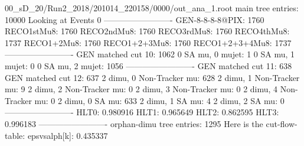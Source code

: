 00_sD_20/Run2_2018/201014_220158/0000/out_ana_1.root
main tree entries: 10000
Looking at Events 0
-------------------------
GEN-8-8-8-8@PIX: 1760
RECO1stMu8: 1760
RECO2ndMu8: 1760
RECO3rdMu8: 1760
RECO4thMu8: 1737
RECO1+2Mu8: 1760
RECO1+2+3Mu8: 1760
RECO1+2+3+4Mu8: 1737
-------------------------
GEN matched cut 10: 1062
0 SA mu, 0 mujet: 1
0 SA mu, 1 mujet: 0
0 SA mu, 2 mujet: 1056
-------------------------
GEN matched cut 11: 638
GEN matched cut 12: 637
2 dimu, 0 Non-Tracker mu: 628
2 dimu, 1 Non-Tracker mu: 9
2 dimu, 2 Non-Tracker mu: 0
2 dimu, 3 Non-Tracker mu: 0
2 dimu, 4 Non-Tracker mu: 0
2 dimu, 0 SA mu: 633
2 dimu, 1 SA mu: 4
2 dimu, 2 SA mu: 0
-------------------------
HLT0: 0.980916
HLT1: 0.965649
HLT2: 0.862595
HLT3: 0.996183
-------------------------
orphan-dimu tree entries: 1295
Here is the cut-flow-table:
epsvsalph[k]: 0.435337
        
